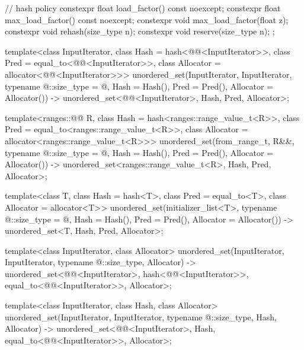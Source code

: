 \begin{codeblock}
{{    // hash policy
    constexpr float load_factor() const noexcept;
    constexpr float max_load_factor() const noexcept;
    constexpr void max_load_factor(float z);
    constexpr void rehash(size_type n);
    constexpr void reserve(size_type n);
  };

  template<class InputIterator,
           class Hash = hash<@@<InputIterator>>,
           class Pred = equal_to<@@<InputIterator>>,
           class Allocator = allocator<@@<InputIterator>>>
    unordered_set(InputIterator, InputIterator, typename @\seebelow@::size_type = @\seebelow@,
                  Hash = Hash(), Pred = Pred(), Allocator = Allocator())
      -> unordered_set<@@<InputIterator>,
                       Hash, Pred, Allocator>;

  template<ranges::@@ R,
           class Hash = hash<ranges::range_value_t<R>>,
           class Pred = equal_to<ranges::range_value_t<R>>,
           class Allocator = allocator<ranges::range_value_t<R>>>
    unordered_set(from_range_t, R&&, typename @\seebelow@::size_type = @\seebelow@,
Hash = Hash(), Pred = Pred(), Allocator = Allocator())
      -> unordered_set<ranges::range_value_t<R>, Hash, Pred, Allocator>;

  template<class T, class Hash = hash<T>,
           class Pred = equal_to<T>, class Allocator = allocator<T>>
    unordered_set(initializer_list<T>, typename @\seebelow@::size_type = @\seebelow@,
                  Hash = Hash(), Pred = Pred(), Allocator = Allocator())
      -> unordered_set<T, Hash, Pred, Allocator>;

  template<class InputIterator, class Allocator>
    unordered_set(InputIterator, InputIterator, typename @\seebelow@::size_type, Allocator)
      -> unordered_set<@@<InputIterator>,
                       hash<@@<InputIterator>>,
                       equal_to<@@<InputIterator>>,
                       Allocator>;

  template<class InputIterator, class Hash, class Allocator>
    unordered_set(InputIterator, InputIterator, typename @\seebelow@::size_type,
                  Hash, Allocator)
      -> unordered_set<@@<InputIterator>, Hash,
                       equal_to<@@<InputIterator>>,
                       Allocator>;

}
\end{codeblock}
